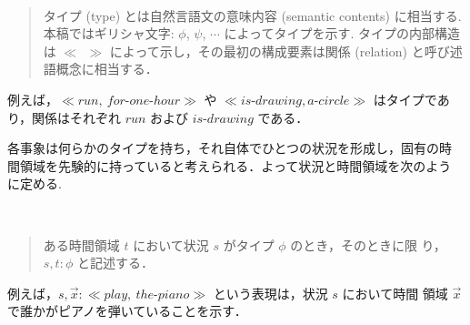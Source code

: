 \begin{my-spec}[タイプ]~
\begin{quote}
タイプ (type) とは自然言語文の意味内容 (semantic contents) に相当する.
本稿ではギリシャ文字: $\phi$, $\psi$, $\cdots$ によってタイプを示す.
タイプの内部構造は $\ll ~~\gg$ によって示し，その最初の構成要素は関係 
(relation) と呼び述語概念に相当する．
\end{quote}
\end{my-spec}
例えば，$\ll run, ~for\mbox{-}one\mbox{-}hour \gg$ や $\ll
is\mbox{-}drawing, a\mbox{-}circle 
\gg$ はタイプであり，関係はそれぞれ $run$ および $is\mbox{-}drawing$ 
である．

各事象は何らかのタイプを持ち，それ自体でひとつの状況を形成し，固有の時
間領域を先験的に持っていると考えられる．よって状況と時間領域を次のよう
に定める.
\begin{my-spec}[状況と時間領域]~\label{spec:type}
\begin{quote}
ある時間領域 $t$ において状況 $s$ がタイプ $\phi$ のとき，そのときに限
り，$s,t \colon \phi$ と記述する．
\end{quote}
\end{my-spec}
例えば，$s,{\vec
x}\colon \ll play, ~the\mbox{-}piano \gg$ という表現は，状況 $s$ において時間
領域 $\vec x$ で誰かがピアノを弾いていることを示す．

